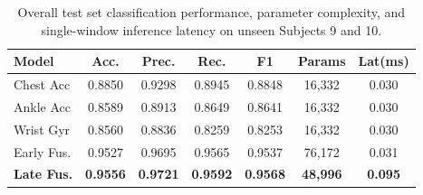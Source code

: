 \documentclass[10pt,twocolumn]{article}
\begin{document}
\begin{table}[t]
\centering
\footnotesize
\setlength{\tabcolsep}{1.9pt}
\caption{Overall test set classification performance, parameter complexity, and single-window inference latency on unseen Subjects 9 and 10.}
\label{tab:overall_results}
\begin{tabular}{@{}lcccccc@{}}
\toprule
\textbf{Model} & \textbf{Acc.} & \textbf{Prec.} & \textbf{Rec.} & \textbf{F1} & \textbf{Params} & \textbf{Lat(ms)} \\
\midrule
Chest Acc & 0.8850 & 0.9298 & 0.8945 & 0.8848 & 16,332 & 0.030 \\
Ankle Acc & 0.8589 & 0.8913 & 0.8649 & 0.8641 & 16,332 & 0.030 \\
Wrist Gyr & 0.8560 & 0.8836 & 0.8259 & 0.8253 & 16,332 & 0.030 \\
Early Fus. & 0.9527 & 0.9695 & 0.9565 & 0.9537 & 76,172 & 0.031 \\
\textbf{Late Fus.} & \textbf{0.9556} & \textbf{0.9721} & \textbf{0.9592} & \textbf{0.9568} & \textbf{48,996} & \textbf{0.095} \\
\bottomrule
\end{tabular}
\end{table}
\vspace{6pt}
\end{document}
